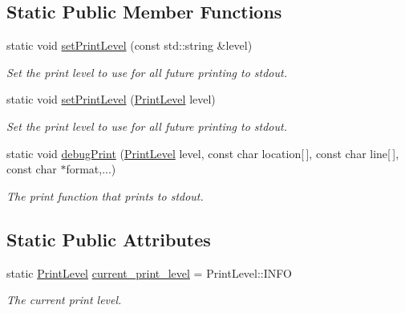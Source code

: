 \subsection*{Static Public Member Functions}
\begin{DoxyCompactItemize}
\item 
static void \hyperlink{classov__core_1_1Printer_a46c933308a512618c304afefee62ead8}{set\+Print\+Level} (const std\+::string \&level)
\begin{DoxyCompactList}\small\item\em Set the print level to use for all future printing to stdout. \end{DoxyCompactList}\item 
static void \hyperlink{classov__core_1_1Printer_a3edd554248a7e269f4c1d0d3f84a257b}{set\+Print\+Level} (\hyperlink{classov__core_1_1Printer_a1c4c6c612ec6251afd91a1ddf933a0b2}{Print\+Level} level)
\begin{DoxyCompactList}\small\item\em Set the print level to use for all future printing to stdout. \end{DoxyCompactList}\item 
static void \hyperlink{classov__core_1_1Printer_a5371993bfa709539ca870884f7c76f78}{debug\+Print} (\hyperlink{classov__core_1_1Printer_a1c4c6c612ec6251afd91a1ddf933a0b2}{Print\+Level} level, const char location\mbox{[}$\,$\mbox{]}, const char line\mbox{[}$\,$\mbox{]}, const char $\ast$format,...)
\begin{DoxyCompactList}\small\item\em The print function that prints to stdout. \end{DoxyCompactList}\end{DoxyCompactItemize}
\subsection*{Static Public Attributes}
\begin{DoxyCompactItemize}
\item 
\mbox{\label{classov__core_1_1Printer_a29f197352b671a22704ffdd8354b33bd}} 
static \hyperlink{classov__core_1_1Printer_a1c4c6c612ec6251afd91a1ddf933a0b2}{Print\+Level} \hyperlink{classov__core_1_1Printer_a29f197352b671a22704ffdd8354b33bd}{current\+\_\+print\+\_\+level} = Print\+Level\+::\+I\+N\+FO
\begin{DoxyCompactList}\small\item\em The current print level. \end{DoxyCompactList}\end{DoxyCompactItemize}


